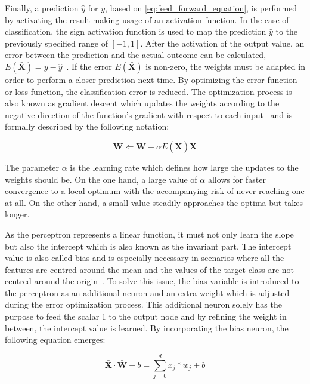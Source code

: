 \documentclass[draft,final]{vutinfth} %
\newcommand{\p}[1]{see p. #1}
\begin{document}
    Finally, a prediction $\hat{y}$ for $y$, based on \autoref{eq:feed_forward_equation}, is performed by activating the result making usage of an activation function.
    In the case of classification, the sign activation function is used to map the prediction $\hat{y}$ to the previously specified range of $[-1,1]$.
    After the activation of the output value, an error between the prediction and the actual outcome can be calculated, $E(\bar{\boldsymbol{X}}) = y - \hat{y}$~\citep[\p{5ff}]{aggarwal_neural_2018}.
    If the error $E(\bar{\boldsymbol{X}})$ is non-zero, the weights must be adapted in order to perform a closer prediction next time.
    By optimizing the error function or loss function, the classification error is reduced.
    The optimization process is also known as gradient descent which updates the weights according to the negative direction of the function's gradient with respect to each input~\citep[\p{7}]{aggarwal_neural_2018} and is formally described by the following notation:

    \begin{equation}
        \bar{\boldsymbol{W}} \Leftarrow \bar{\boldsymbol{W}} + \alpha E(\bar{\boldsymbol{X}})\bar{\boldsymbol{X}}\label{eq:weight_adjusting}
    \end{equation}

    The parameter $\alpha$ is the learning rate which defines how large the updates to the weights should be.
    On the one hand, a large value of $\alpha$ allows for faster convergence to a local optimum with the accompanying risk of never reaching one at all.
    On the other hand, a small value steadily approaches the optima but takes longer.


    As the perceptron represents a linear function, it must not only learn the slope but also the intercept which is also known as the invariant part.
    The intercept value is also called bias and is especially necessary in scenarios where all the features are centred around the mean and the values of the target class are not centred around the origin~\citep[\p{6}]{aggarwal_neural_2018}.
    To solve this issue, the bias variable is introduced to the perceptron as an additional neuron and an extra weight which is adjusted during the error optimization process.
    This additional neuron solely has the purpose to feed the scalar 1 to the output node and by refining the weight in between, the intercept value is learned.
    By incorporating the bias neuron, the following equation emerges:

    \begin{equation}
        \bar{\boldsymbol{X}}\cdot\bar{\boldsymbol{W}} + b=\sum_{j=0}^{d}x_j*w_j + b\label{eq:linear_function_equation}
    \end{equation}
\end{document}
